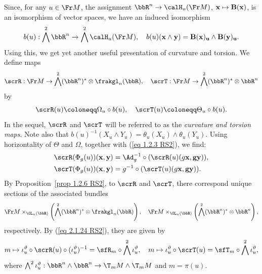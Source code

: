 \begin{rem}\label{rem 2.1.16 RS2}
    Since, for any $u\in\Fr M$, the assignment $\bbR^n\to \calH_u (\Fr M)$, $\bf{x}\mapsto B(\bf{x})$, is an isomorphism of vector spaces, we have an induced isomorphism 
    \[b(u):\bigwedge^2\bbR^n\to \bigwedge^2 \calH_u(\Fr M),\quad b(u)(\bf{x}\wedge\bf{y})=B(\bf{x})_u\wedge B(\bf{y})_u.\]
    Using this, we get yet another useful presentation of curvature and torsion. We define maps 
    \[\scrR:\Fr M\to \bigwedge^2(\bbR^n)^\ast \otimes\frakgl_n(\bbR),\quad \scrT:\Fr M\to \bigwedge^2(\bbR^n)^\ast\otimes\bbR^n\]
    by 
    \[\scrR(u)\coloneqq \Omega_u\circ b(u),\quad \scrT(u)\coloneqq \Theta_u\circ b(u).\label{eq 2.1.24 RS2}\]
    In the sequel, $\scrR$ and $\scrT$ will be referred to as the \emph{curvature and torsion maps}. Note also that $b(u)^{-1}(X_u\wedge Y_u)=\theta_u(X_u)\wedge\theta_u(Y_u)$. Using horizontality of $\Theta$ and $\Omega$, together with (\ref{eq 1.2.3 RS2}), we find:
    \begin{align}
        \scrR(\Phi_g(u))(\bf{x},\bf{y})&=\Ad_g^{-1}\circ (\scrR(u)(g\bf{x},g\bf{y})),\\
        \scrT(\Phi_g(u))(\bf{x},\bf{y})&= g^{-1}\circ (\scrT(u)(g\bf{x},g\bf{y})).
    \end{align}
    By Proposition~\ref{prop 1.2.6 RS2}, to $\scrR$ and $\scrT$, there correspond unique sections of the associated bundles 
    \[\Fr M\times_{\GL_n(\bbR)}\left(\bigwedge^2(\bbR^n)^\ast \otimes \frakgl_n(\bbR)\right),\quad \Fr M\times_{\GL_n(\bbR)}\left(\bigwedge^2(\bbR^n)^\ast \otimes\bbR^n\right),\]
    respectively. By (\ref{eq 2.1.24 RS2}), they are given by 
    \[m\mapsto \iota_u^\vartheta\circ \scrR(u)\circ (\iota_u^\vartheta)^{-1}=\sfR_m\circ\bigwedge^2 \iota_u^\vartheta,\quad m\mapsto \iota_u^\vartheta\circ\scrT(u)=\sfT_m\circ \bigwedge^2 \iota_u^\vartheta,\]
    where $\bigwedge^2 \iota_u^\vartheta:\bbR^n\wedge\bbR^n\to \T_mM\wedge \T_mM$ and $m=\pi(u)$.
\end{rem}


